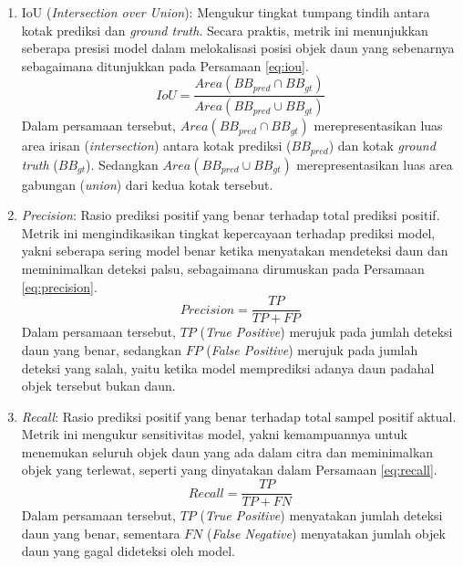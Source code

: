 \begin{enumerate}[nosep]
    \item IoU (\textit{Intersection over Union}): Mengukur tingkat tumpang tindih antara kotak prediksi dan \textit{ground truth}. Secara praktis, metrik ini menunjukkan seberapa presisi model dalam melokalisasi posisi objek daun yang sebenarnya sebagaimana ditunjukkan pada Persamaan \ref{eq:iou}.
    \begin{equation}
        IoU = \frac{Area(BB_{pred} \cap BB_{gt})}{Area(BB_{pred} \cup BB_{gt})}
        \label{eq:iou}
    \end{equation}
    Dalam persamaan tersebut, $Area(BB_{pred} \cap BB_{gt})$ merepresentasikan luas area irisan (\textit{intersection}) antara kotak prediksi ($BB_{pred}$) dan kotak \textit{ground truth} ($BB_{gt}$). Sedangkan $Area(BB_{pred} \cup BB_{gt})$ merepresentasikan luas area gabungan (\textit{union}) dari kedua kotak tersebut.

    \item \textit{Precision}: Rasio prediksi positif yang benar terhadap total prediksi positif. Metrik ini mengindikasikan tingkat kepercayaan terhadap prediksi model, yakni seberapa sering model benar ketika menyatakan mendeteksi daun dan meminimalkan deteksi palsu, sebagaimana dirumuskan pada Persamaan \ref{eq:precision}.
    \begin{equation}
        Precision = \frac{TP}{TP + FP}
        \label{eq:precision}
    \end{equation}
    Dalam persamaan tersebut, $TP$ (\textit{True Positive}) merujuk pada jumlah deteksi daun yang benar, sedangkan $FP$ (\textit{False Positive}) merujuk pada jumlah deteksi yang salah, yaitu ketika model memprediksi adanya daun padahal objek tersebut bukan daun.

    \item \textit{Recall}: Rasio prediksi positif yang benar terhadap total sampel positif aktual. Metrik ini mengukur sensitivitas model, yakni kemampuannya untuk menemukan seluruh objek daun yang ada dalam citra dan meminimalkan objek yang terlewat, seperti yang dinyatakan dalam Persamaan \ref{eq:recall}.
    \begin{equation}
        Recall = \frac{TP}{TP + FN}
        \label{eq:recall}
    \end{equation}
    Dalam persamaan tersebut, $TP$ (\textit{True Positive}) menyatakan jumlah deteksi daun yang benar, sementara $FN$ (\textit{False Negative}) menyatakan jumlah objek daun yang gagal dideteksi oleh model.


\end{enumerate}
